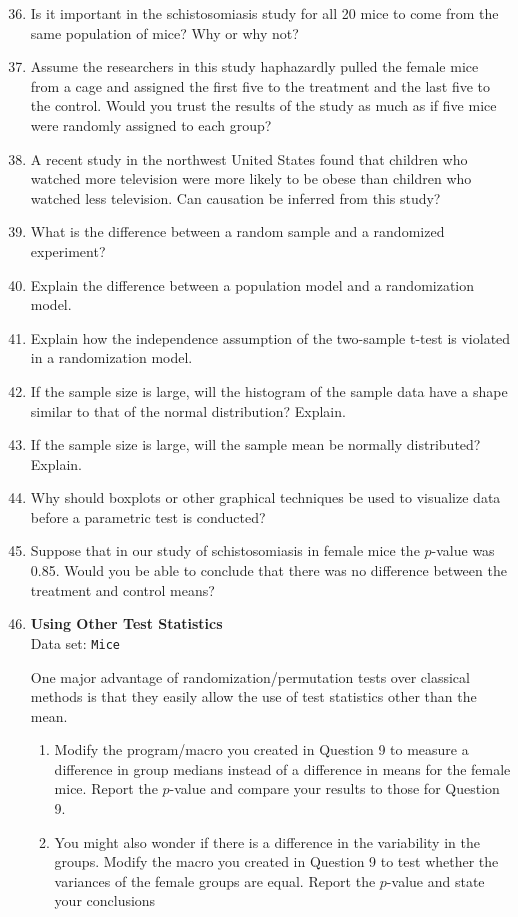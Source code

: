 \documentclass[
]{report}
\begin{document}
\begin{enumerate}
  \setcounter{enumi}{35}

  \item Is it important in the schistosomiasis study for all 20 mice to come from the same population of mice? Why or why not?
  \item Assume the researchers in this study haphazardly pulled the female mice from a cage and assigned the first five to the treatment and the last five to the control. Would you trust the results of the study as much as if five mice were randomly assigned to each group?
  \item A recent study in the northwest United States found that children who watched more television were
more likely to be obese than children who watched less television. Can causation be inferred from
this study?
  \item What is the difference between a random sample and a randomized experiment?
  \item Explain the difference between a population model and a randomization model.
  \item Explain how the independence assumption of the two-sample t-test is violated in a randomization model.
  \item If the sample size is large, will the histogram of the sample data have a shape similar to that of the normal distribution? Explain.
  \item If the sample size is large, will the sample mean be normally distributed? Explain.
  \item Why should boxplots or other graphical techniques be used to visualize data before a parametric test
is conducted?
  \item Suppose that in our study of schistosomiasis in female mice the $\scriptstyle p$-value was 0.85. Would you be able to conclude that there was no difference between the treatment and control means?
  \item \textbf{Using Other Test Statistics} \\
  Data set: \texttt{Mice} 
  
  One major advantage of randomization/permutation tests over classical methods is that they easily allow the use of test statistics other than the mean.
  \begin{enumerate}
    \item Modify the program/macro you created in Question 9 to measure a difference in group medians instead of a difference in means for the female mice. Report the $\scriptstyle p$-value and compare your results to those for Question 9.
    \item You might also wonder if there is a difference in the variability in the groups. Modify the macro
you created in Question 9 to test whether the variances of the female groups are equal. Report the
$\scriptstyle p$-value and state your conclusions
  \end{enumerate}
  

\end{enumerate}
\end{document}
